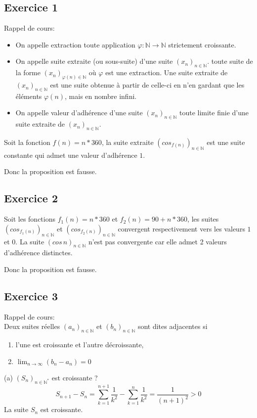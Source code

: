 \documentclass[]{book}
\theoremstyle{definition}
\newcommand{\bb}[1]{\mathbb{#1}}
\newcommand{\N}{\bb{N}}
\begin{document}
\subsection*{Exercice 1}

Rappel de cours: 
\begin{itemize}
\item On appelle extraction toute application $\varphi : \N \to \N$ strictement croissante.
\item On appelle suite extraite (ou sous-suite) d'une suite $(x_n)_{n \in \N}$. toute suite de la forme
$(x_n)_{\varphi(n) \in \N}$ o\`u $\varphi$ est une extraction. Une suite extraite de $(x_n)_{n \in \N}$ est une suite obtenue à partir de celle-ci en n’en gardant que les éléments $\varphi(n)$, mais en nombre infini.
\item On appelle valeur d'adh\'erence d'une suite $(x_n)_{n \in \N}$ toute limite finie d'une suite extraite de
$(x_n)_{n \in \N}$.
\end{itemize}


Soit la fonction $f(n) = n*360$, la suite extraite $(cos_{f(n)})_{n \in \N}$ est une suite constante qui admet une valeur d'adh\'erence $1$.

Donc la proposition est fausse.

\subsection*{Exercice 2}
Soit les fonctions $f_1(n) = n*360$ et $f_2(n) = 90+n*360$, les suites $(cos_{f_1(n)})_{n \in \N}$ et $(cos_{f_2(n)})_{n \in \N}$ convergent respectivement vers les valeurs $1$ et $0$. La suite $(cos\, n)_{n \in \N}$ n'est pas convergente car elle admet 2 valeurs d'adh\'erence distinctes. 	

Donc la proposition est fausse.


\subsection*{Exercice 3}
Rappel de cours: \\
Deux suites r\'eelles $(a_n)_{n \in \N}$ et $(b_n)_{n \in \N}$ sont dites adjacentes si
\begin{enumerate}
\item l'une est croissante et l'autre d\'ecroissante,
\item $\lim_{n \to \infty}(b_n - a_n) = 0 $
\end{enumerate}

(a) $(S_n)_{n \in \N^{*}}$ est croissante ?\\
$$S_{n+1} - S_{n} = \sum_{k=1}^{n+1}\frac{1}{k^2} - \sum_{k=1}^{n}\frac{1}{k^2} = \frac{1}{(n+1)^2} > 0$$  
La suite $S_n$ est croissante.\\
\end{document}
